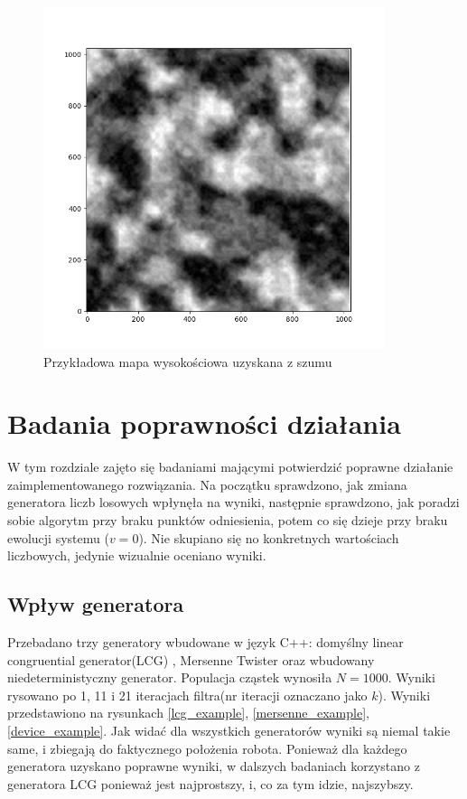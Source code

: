 \begin{figure}[H]
\begin{center}
	\includegraphics[width=10cm]{./przykladowa_mapa_szumu.png}
	\caption{Przykładowa mapa wysokościowa uzyskana z szumu}
	\label{przykladowa_mapa_szumu}
\end{center}
\end{figure}

\section{Badania poprawności działania}
W tym rozdziale zajęto się badaniami mającymi potwierdzić poprawne działanie zaimplementowanego rozwiązania. Na początku sprawdzono, jak zmiana generatora liczb losowych wpłynęła na wyniki, następnie sprawdzono, jak poradzi sobie algorytm przy braku punktów odniesienia, potem co się dzieje przy braku ewolucji systemu ($v=0$). Nie skupiano się no konkretnych wartościach liczbowych, jedynie wizualnie oceniano wyniki.

\subsection{Wpływ generatora}
Przebadano trzy generatory wbudowane w język C++: domyślny linear congruential generator(LCG) \cite{lcg_wiki}, Mersenne Twister \cite{mersenne_wiki} oraz wbudowany niedeterministyczny generator. Populacja cząstek wynosiła $N=1000$. Wyniki rysowano po 1, 11 i 21 iteracjach filtra(nr iteracji oznaczano jako $k$). Wyniki przedstawiono na rysunkach \ref{lcg_example}, \ref{mersenne_example}, \ref{device_example}. Jak widać dla wszystkich generatorów wyniki są niemal takie same, i zbiegają do faktycznego położenia robota. Ponieważ dla każdego generatora uzyskano poprawne wyniki, w dalszych badaniach korzystano z generatora LCG ponieważ jest najprostszy, i, co za tym idzie, najszybszy.

